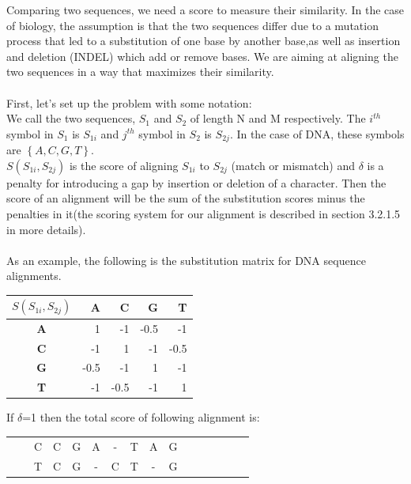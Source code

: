 \documentclass[11pt,a4paper]{report}
\begin{document}
Comparing two sequences, we need a score to measure their similarity.
In the case of biology, the assumption is that the two sequences differ
due to a mutation process that led to a substitution 
of one base by another base,as well as insertion and deletion (INDEL) which add or remove bases.
We are aiming at aligning the two sequences in a way that maximizes their similarity.\\ \\
First, let's set up the problem with some notation:\\
We call the two sequences, $S_{1}$ and $S_{2}$ of length N and M respectively. 
The $i^{th}$ symbol in $S_{1}$ is $S_{1i}$ and $j^{th}$ symbol in $S_{2}$ is $S_{2j}$. 
In the case of DNA, these symbols are $\left\{A, C, G, T\right\}$.\\
$S(S_{1i}, S_{2j})$ is the score of aligning $S_{1i}$ to $S_{2j}$ (match or mismatch)
and $\delta$ is a penalty for introducing a gap by insertion or deletion of a character. 
Then the score of an alignment will be the sum of the substitution scores minus the 
penalties in it(the scoring system for our alignment is described in section 3.2.1.5 in more details).\\\\
As an example, the following is the substitution matrix for DNA sequence alignments.


\begin{table}[H]
 \centering
  \begin{tabular}{  c| r  r r  r }
    
  \textbf{  $S(S_{1i}, S_{2j})$ } & \textbf{A} &\textbf{ C} &\textbf{ G} &\textbf{ T} \\ \hline
       \textbf{A} &  1  & -1 & -0.5 & -1 \\
       \textbf{C} & -1  & 1 & -1 & -0.5 \\ 
       \textbf{G} & -0.5 & -1 & 1 & -1 \\ 
       \textbf{T} & -1 & -0.5 & -1 & 1
    \end{tabular}
\label{alignment-exp}
\end{table}

If $\delta$=1 then the total score of following alignment is:
 
\begin{center}
	\begin{tabular}{c *{12}cccc}
        & & C & C & G & A & - & T & A & G && \\
 	  & & T  & C & G &  -  & C   &  T & -  & G & \\
    	                                 
	\end{tabular}
\end{center} 
\end{document}
